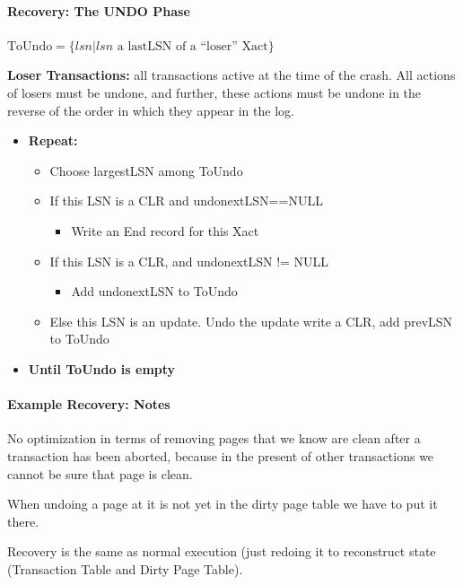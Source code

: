 \paragraph{Recovery: The UNDO Phase}
$\text{ToUndo} = \{lsn | lsn \text{ a lastLSN of a ``loser'' Xact}\}$

\textbf{Loser Transactions:} all transactions active at the time
of the crash. All actions of losers must be undone, and further,
these actions must be undone in the reverse of the order in which
they appear in the log.

\begin{itemize}
\item \textbf{Repeat:}
  \begin{itemize}
  \item Choose largestLSN among ToUndo
  \item If this LSN is a CLR and undonextLSN==NULL
    \begin{itemize}
    \item Write an End record for this Xact
    \end{itemize}

  \item If this LSN is a CLR, and undonextLSN != NULL
    \begin{itemize}
    \item Add undonextLSN to ToUndo
    \end{itemize}

  \item Else this LSN is an update. Undo the update write a CLR,
    add prevLSN to ToUndo
  \end{itemize}
\item \textbf{Until ToUndo is empty}
\end{itemize}

\paragraph{Example Recovery: Notes}
No optimization in terms of removing pages that we know
are clean after a transaction has been aborted, because
in the present of other transactions we cannot be sure
that page is clean.

When undoing a page at it is not yet in the dirty page table
we have to put it there.

Recovery is the same as normal execution (just redoing it
to reconstruct state (Transaction Table and Dirty Page Table).



